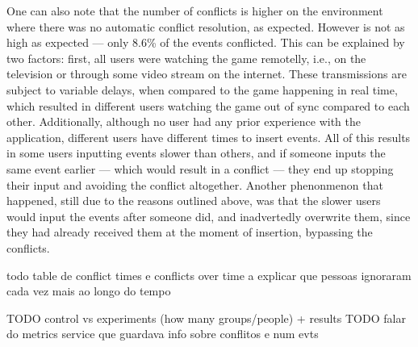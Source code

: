 One can also note that the number of conflicts is higher on the environment where there was no automatic conflict resolution, as expected. However is not as high as expected --- only 8.6\% of the events conflicted. This can be explained by two factors: first, all users were watching the game remotelly, i.e., on the television or through some video stream on the internet. These transmissions are subject to variable delays, when compared to the game happening in real time, which resulted in different users watching the game out of sync compared to each other. Additionally, although no user had any prior experience with the application, different users have different times to insert events. All of this results in some users inputting events slower than others, and if someone inputs the same event earlier --- which would result in a conflict --- they end up stopping their input and avoiding the conflict altogether. Another phenonmenon that happened, still due to the reasons outlined above, was that the slower users would input the events after someone did, and inadvertedly overwrite them, since they had already received them at the moment of insertion, bypassing the conflicts.

todo table de conflict times e conflicts over time a explicar que pessoas ignoraram cada vez mais ao longo do tempo

{\Huge TODO control vs experiments (how many groups/people) + results}
{\Huge TODO falar do metrics service que guardava info sobre conflitos e num evts}

